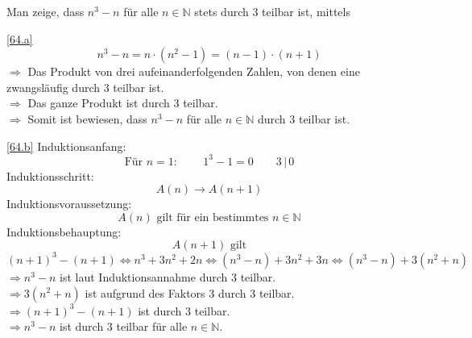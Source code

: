 \documentclass[a4paper, margins=2.5cm]{homework}
\newcommand{\N}{\mathbb{N}}
\begin{document}
\begin{problem}
	Man zeige, dass $n^3-n$ für alle $n \in \N$ stets durch 3 teilbar ist, mittels
\end{problem}
\begin{solution}
	\ref{64.a}
	\[ n^3-n = n \cdot (n^2-1) = (n-1) \cdot (n+1) \]
	$\Longrightarrow$ Das Produkt von drei aufeinanderfolgenden Zahlen, von denen
	eine zwangsläufig durch 3 teilbar ist.  \\
	$\Longrightarrow$ Das ganze Produkt ist durch 3 teilbar. \\
	$\Longrightarrow$ Somit ist bewiesen, dass $n^3-n$ für alle $n \in \N$ durch
	3 teilbar ist.

	\newpage

	\ref{64.b}
	Induktionsanfang: \[ \text{Für $n = 1$: }\qquad 1^3 - 1 = 0\qquad 3\, \vert \, 0 \]
	Induktionsschritt: \[ A(n) \rightarrow A(n+1) \]
	Induktionsvoraussetzung: \[ A(n) \text{ gilt für ein bestimmtes } n \in \N \]
	Induktionsbehauptung: \[ A(n+1) \text{ gilt} \]
	\[ (n+1)^3 - (n+1) \Longleftrightarrow n^3 + 3n^2 + 2n \Longleftrightarrow
	(n^3-n) + 3n^2 + 3n \Longleftrightarrow (n^3-n) + 3(n^2+n) \]
	$\Longrightarrow n^3-n$ ist laut Induktionsannahme durch 3 teilbar. \\
	$\Longrightarrow 3(n^2+n)$ ist aufgrund des Faktors 3 durch 3 teilbar. \\
	$\Longrightarrow (n+1)^3 - (n+1)$ ist durch 3 teilbar. \\
	$\Longrightarrow n^3-n$ ist durch 3 teilbar für alle $n \in \N$.
\end{solution}
\end{document}
